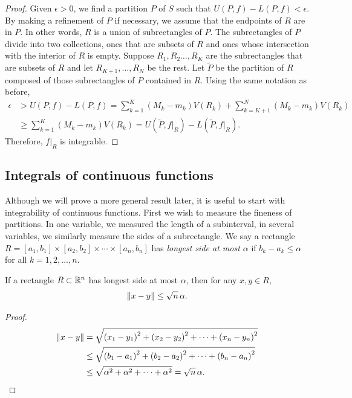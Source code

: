 \begin{proof}
Given $\epsilon > 0$, we find a partition $P$ of $S$ such that
$U(P,f)-L(P,f) < \epsilon$.  By making a refinement of $P$
if necessary,
we assume that the endpoints of $R$ are in $P$.  In other words,
$R$ is a union of subrectangles of $P$.  The subrectangles of $P$
divide into two collections, ones that are subsets of $R$
and ones whose intersection with the interior of $R$ is empty.
Suppose $R_1,R_2\ldots,R_K$ are the subrectangles that
are subsets of $R$ and let $R_{K+1},\ldots, R_N$ be the rest.
Let $\widetilde{P}$ be the partition of $R$ composed of 
those subrectangles of $P$ contained in $R$.
Using the same notation as before,
\begin{equation*}
\begin{split}
\epsilon & > 
U(P,f)-L(P,f)
=
\sum_{k=1}^K (M_k-m_k) V(R_k)
+
\sum_{k=K+1}^N (M_k-m_k) V(R_k)
\\
&
\geq
\sum_{k=1}^K (M_k-m_k) V(R_k)
=
U(\widetilde{P},f|_R)-L(\widetilde{P},f|_R) .
\end{split}
\end{equation*}
Therefore, $f|_R$ is integrable.
\end{proof}

\subsection{Integrals of continuous functions}

Although we will prove a more general result later, it is useful to start
with integrability of continuous functions.
First we wish to measure the fineness of partitions.  In one variable, we
measured the length of a subinterval, in several variables, we similarly
measure the sides of a subrectangle.
We say a rectangle $R = [a_1,b_1] \times
[a_2,b_2] \times \cdots \times
[a_n,b_n]$ has \emph{longest side at most $\alpha$} if
$b_k-a_k \leq \alpha$ for all $k=1,2,\ldots,n$.

\begin{prop} \label{prop:diameterrectangle}
If a rectangle $R \subset {\mathbb{R}}^n$ has longest side at most $\alpha$, then
for any $x,y \in R$,
\begin{equation*}
\lVert {x-y} \rVert \leq \sqrt{n} \, \alpha .
\end{equation*}
\end{prop}

\begin{proof}
\begin{equation*}
\begin{split}
\lVert {x-y} \rVert 
& =
\sqrt{
{(x_1-y_1)}^2
+
{(x_2-y_2)}^2
+ \cdots +
{(x_n-y_n)}^2
}
\\
& \leq
\sqrt{
{(b_1-a_1)}^2
+
{(b_2-a_2)}^2
+ \cdots +
{(b_n-a_n)}^2
}
\\
& \leq
\sqrt{
{\alpha}^2
+
{\alpha}^2
+ \cdots +
{\alpha}^2
}
=
\sqrt{n} \, \alpha .  \qedhere
\end{split}
\end{equation*}
\end{proof}


